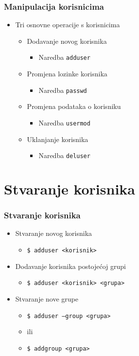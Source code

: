 \documentclass[table,usenames,dvipsnames] {beamer}
\newcommand{\shell}[1]{\texttt{#1}}
\begin{document}
\begin{frame}[t]
\frametitle{Manipulacija korisnicima}
\begin{itemize}
  \item Tri osnovne operacije s korisnicima
  \begin{itemize}
    \item Dodavanje novog korisnika
    \begin{itemize}
      \item Naredba \shell{adduser}
    \end{itemize}
    \item Promjena lozinke korisnika
    \begin{itemize}
      \item Naredba \shell{passwd}
    \end{itemize}
    \item Promjena podataka o korisniku
    \begin{itemize}
      \item Naredba \shell{usermod}
    \end{itemize}
    \item Uklanjanje korisnika
    \begin{itemize}
      \item Naredba \shell{deluser}
    \end{itemize}
  \end{itemize}
\end{itemize}
\end{frame}

\section{Stvaranje korisnika}
\begin{frame}[t]
\frametitle{Stvaranje korisnika}
\begin{itemize}
  \item Stvaranje novog korisnika
  \begin{itemize}
    \item[] \shell{\$ adduser <korisnik>}
  \end{itemize}
  \item Dodavanje korisnika postojećoj grupi
  \begin{itemize}
    \item[] \shell{\$ adduser <korisnik> <grupa>}
  \end{itemize}
  \item Stvaranje nove grupe
  \begin{itemize}
    \item[] \shell{\$ adduser --group <grupa>}
    \item[] ili
    \item[] \shell{\$ addgroup <grupa>}
  \end{itemize}
\end{itemize}
\end{frame}
\end{document}
